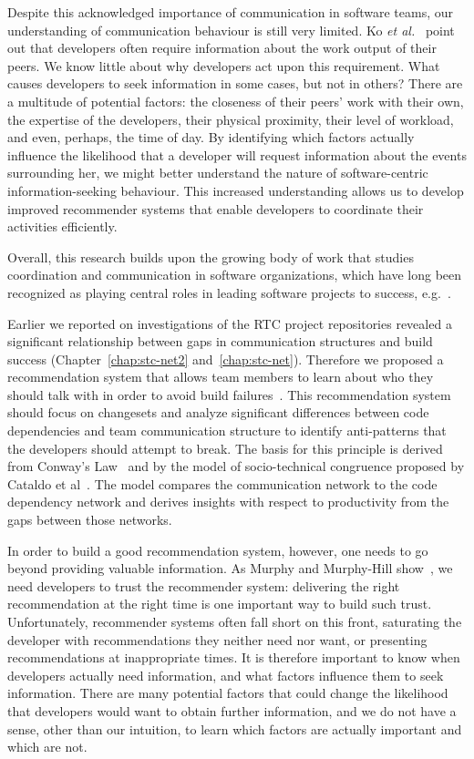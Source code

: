 Despite this acknowledged importance of communication in software teams, our understanding of communication behaviour is still very limited. Ko \emph{et al.}~\cite{ko:icse:2007} point out that developers often require information about the work output of their peers.  We know little about why developers act upon this requirement. What causes developers to seek information in some cases, but not in others? There are a multitude of potential factors: the closeness of their peers' work with their own, the expertise of the developers, their physical proximity, their level of workload, and even, perhaps, the time of day. By identifying which factors actually influence the likelihood that a developer will request information about the events surrounding her, we might better understand the nature of software-centric information-seeking behaviour. This increased understanding allows us to develop improved recommender systems that enable developers to coordinate their activities efficiently.

Overall, this research builds upon the growing body of work that studies coordination and communication in software organizations, which have long been recognized as playing central roles in leading software projects to success, e.g.~\cite{kraut:1995coordination,curtis:acm:1988}.  

Earlier we reported on investigations of the RTC project repositories revealed a significant relationship between gaps in communication structures and build success (Chapter~\ref{chap:stc-net2} and~\ref{chap:stc-net}). Therefore we proposed a recommendation system that allows team members to learn about who they should talk with in order to avoid build failures~\cite{schroeter:rsse:2008}. This recommendation system should focus on changesets and analyze significant differences between code dependencies and team communication structure to identify anti-patterns that the developers should attempt to break.
The basis for this principle is derived from Conway's Law~\cite{conway:datamination:1968} and by the model of socio-technical congruence proposed by Cataldo et al~\cite{cataldo:cscw:2006,cataldo:esem:2008}.
The model compares the communication network to the code dependency network and derives insights with respect to productivity from the gaps between those networks.

In order to build a good recommendation system, however, one needs to go beyond providing valuable information. As Murphy and Murphy-Hill show~\cite{murphy:rsse:2010}, we need developers to trust the recommender system: delivering the right recommendation at the right time is one important way to build such trust. Unfortunately, recommender systems often fall short on this front, saturating the developer with recommendations they neither need nor want, or presenting recommendations at inappropriate times. It is therefore important to know when developers actually need information, and what factors influence them to seek information. There are many potential factors that could change the likelihood that developers would want to obtain further information, and we do not have a sense, other than our intuition, to learn which factors are actually important and which are not.

